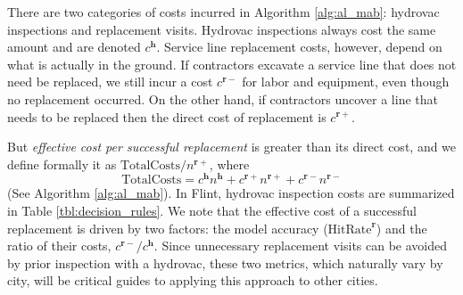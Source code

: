 \documentclass[sigconf]{acmart}
\newcommand{\inspect}{\mathbf{h}}
\newcommand{\replace}{\mathbf{r}}
\begin{document}
There are two categories of costs incurred in Algorithm \ref{alg:al_mab}: hydrovac inspections and replacement visits. Hydrovac inspections always cost the same amount and are denoted $c^\inspect$. Service line replacement costs, however, depend on what is actually in the ground. If contractors excavate a service line that does not need be replaced, we still incur a cost $c^{\replace-}$ for labor and equipment, even though no replacement occurred. On the other hand, if contractors uncover a line that needs to be replaced then the direct cost of replacement is $c^{\replace+}$.

But \emph{effective cost per successful replacement} is greater than its direct cost, and we define formally it as $\text{TotalCosts} / n^{\replace+}$, where
\[
\text{TotalCosts} = c^{\inspect} n^{\inspect} + c^{\replace+} n^{\replace+} + c^{\replace-} n^{\replace-}
\]
(See Algorithm \ref{alg:al_mab}). In Flint, hydrovac inspection costs are summarized in Table \ref{tbl:decision_rules}. We note that the effective cost of a successful replacement is driven by two factors: the model accuracy ($\text{HitRate}^{\replace}$) and the ratio of their costs, $c^{\replace-}/c^{\inspect}$. Since unnecessary replacement visits can be avoided by prior inspection with a hydrovac, these two metrics, which naturally vary by city, will be critical guides to applying this approach to other cities. 
 
\begin{comment}
\begin{algorithm}
\footnotesize{
\begin{algorithmic}[1]
\State Given pool of $n$ unlabeled and $t-1$ labeled observations
\State Initialize \emph{weighted} observation dataset $S \leftarrow \emptyset$
\For{$t=0,\ldots,$NumIter}
	\State Sample: $i_t \sim \text{Uniform}(\text{Unlabeled home indices})$
  \State Estimate: conditional probability of label $\hat{y}_{i_t} = \hat{p}_t(y_{i_t} | x_{i_t})$
	\State Compute: weight $w^{(t)} = W(\hat{y}_{i_t}; MaxPlace)$
	\If{$Q^{(t)} \sim \text{Bernoulli}(w^{(t)})$ returns \textit{TRUE}}
		\State reveal $y^{(t)} = y_i$ via inspection
	\Else \; continue
	\EndIf
	\State $S \leftarrow S \cup \{(x^{(t)},y^{(t)},w^{(t)})\}$
\EndFor
\end{algorithmic}
	\caption{Importance Weighted Active Learning (\textsc{IWAL}) }\label{alg:iwal}
}
\end{algorithm}
\end{comment}
\end{document}
